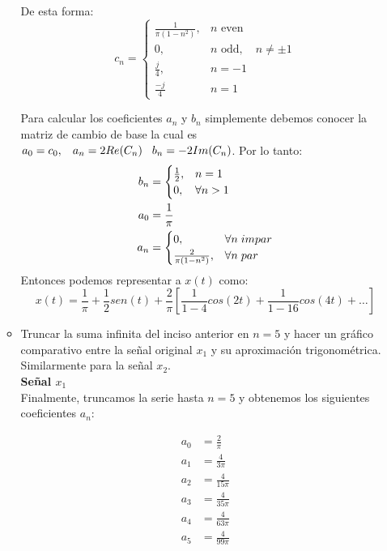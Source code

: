 \documentclass[12pt,a4paper]{report}
\begin{document}
\begin{enumerate}[label=\alph*),left=0pt]
\begin{itemize}[left=0pt]
       De esta forma:
       $$
       c_n = \begin{cases}
            \frac{1}{\pi(1-n^2)}, & n \text{ even} \\[5pt]
            0, & n \text{ odd}, \quad n \neq \pm 1 \\
            \frac{j}{4}, & n=-1 \\
            \frac{-j}{4} & n=1
            \end{cases}$$

        Para calcular los coeficientes $a_n$ y $b_n$ simplemente debemos conocer la matriz de cambio de base la cual es $a_0=c_0,\hspace{0.3cm}a_n=2Re(C_n)\hspace{0.3cm}b_n=-2Im(C_n)$.
        Por lo tanto:
        $$
        \begin{aligned}
            b_n&=\begin{cases}
            \frac{1}{2},& n=1\\
            0, & \forall n >1
        \end{cases}\\
        a_0&=\frac{1}{\pi}\\
        a_n&=\begin{cases}
            0,&\forall n \hspace{0.1cm}impar\\
            \frac{2}{\pi(1-n^2)},& \forall n \hspace{0.1cm} par
        \end{cases}\\  
        \end{aligned}
        $$
        Entonces podemos representar a $x(t)$ como:
        $$
        x(t)=\frac{1}{\pi}+\frac{1}{2}sen(t)+\frac{2}{\pi}[\frac{1}{1-4}cos(2t)+\frac{1}{1-16}cos(4t)+\dots]
        $$


   \item Truncar la suma infinita del inciso anterior en $n = 5$ y hacer un gráfico comparativo entre la señal 
     original $x_1$ y su aproximación trigonométrica. Similarmente para la señal $x_2$.\\

\textbf{Señal $x_1$}\\
     Finalmente, truncamos la serie hasta \(n = 5\) y obtenemos los siguientes coeficientes \(a_n\):
  
     $$
     \begin{aligned}
       a_0 &= \frac{2}{\pi} \\
       a_1 &= \frac{4}{3\pi} \\
       a_2 &= \frac{4}{15\pi} \\
       a_3 &= \frac{4}{35\pi} \\
       a_4 &= \frac{4}{63\pi} \\
       a_5 &= \frac{4}{99\pi}
     \end{aligned}
     $$


\end{itemize}
\end{enumerate}
\end{document}
